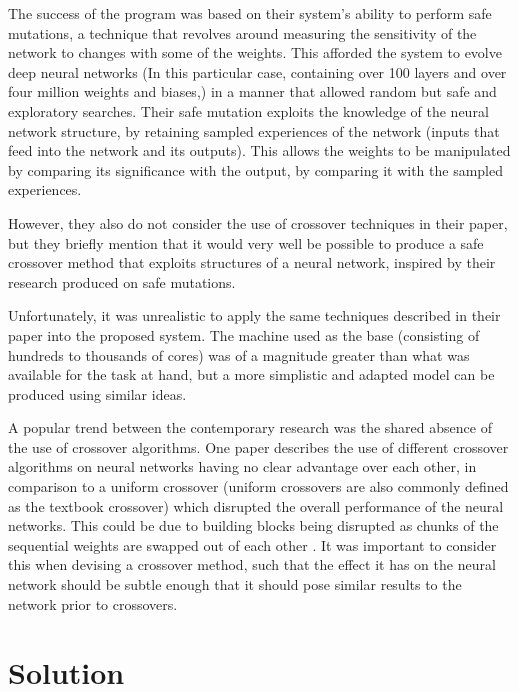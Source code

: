 \documentclass[12pt,a4paper]{article}
\begin{document}
        The success of the program was based on their system's ability to perform safe mutations, a technique that revolves around measuring the sensitivity of the network to changes with some of the weights. \cite{lehman_safe_2017} This afforded the system to evolve deep neural networks (In this particular case, containing over 100 layers and over four million weights and biases,) in a manner that allowed random but safe and exploratory searches. Their safe mutation exploits the knowledge of the neural network structure, by retaining sampled experiences of the network (inputs that feed into the network and its outputs). This allows the weights to be manipulated by comparing its significance with the output, by comparing it with the sampled experiences. 

        However, they also do not consider the use of crossover techniques in their paper, but they briefly mention that it would very well be possible to produce a safe crossover method that exploits structures of a neural network, inspired by their research produced on safe mutations.

        Unfortunately, it was unrealistic to apply the same techniques described in their paper into the proposed system. The machine used as the base (consisting of hundreds to thousands of cores) was of a magnitude greater than what was available for the task at hand, but a more simplistic and adapted model can be produced using similar ideas. 
        
        A popular trend between the contemporary research was the shared absence of the use of crossover algorithms. One paper describes the use of different crossover algorithms on neural networks having no clear advantage over each other, in comparison to a uniform crossover (uniform crossovers are also commonly defined as the textbook crossover) which disrupted the overall performance of the neural networks. This could be due to building blocks being disrupted as chunks of the sequential weights are swapped out of each other \cite{emmanouilidis_comparison_2000}. It was important to consider this when devising a crossover method, such that the effect it has on the neural network should be subtle enough that it should pose similar results to the network prior to crossovers.

\section{Solution}
\end{document}
